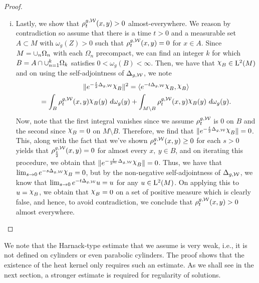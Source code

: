 \documentclass[a4paper, 12pt]{amsart}
\begin{document}
\begin{proof}
\begin{enumerate}[(i)]
\item Lastly, we show that $\rho^{g,\mathcal{W}}_t(x,y) > 0$  almost-everywhere.
	We reason by contradiction so assume that there
	is a time $t > 0$ and a measurable set $A \subset M$ with $\omega_g(Z) > 0$
	such that $\rho^{g,\mathcal{W}}_t(x,y) = 0$ for $x \in A$.
	Since $M = \cup_{n} \Omega_n$ with each 
	$\Omega_n$ precompact, we can find an integer
	$k$ for which $B = A \cap \cup_{n=1}^k \Omega_k$ 
	satisfies $0 < \omega_g(B) < \infty$. Then,
	we have that $\ind{B} \in \Lp{2}(M)$ and 
	on using the self-adjointness of $\Delta_{g,\mathcal{W}}$,
	we note
	\begin{multline*}  
	\norm{e^{-\frac{t}{2} \Delta_{g,\cW}}\ind{B}}^2 
		 = \inprod{e^{-t \Delta_{g,\cW}} \ind{B},\ind{B}} \\
		= \int_{B} \hk^{g,\cW}_t(x,y)\ind{B}(y)\ d\omega_g(y) + 
			\int_{M \setminus B} \hk^{g,\cW}_t(x,y)\ind{B}(y)\ d\omega_g(y).
	\end{multline*}
	Now, note that the first integral vanishes
	since we assume $\rho^{g,\mathcal{W}}_t$ is $0$ on $B$
	and the second since $\ind{B} = 0$ on $M \setminus B$.
	Therefore, we find that $\norm{e^{-\frac{t}{2} \Delta_{g,\cW}} \ind{B}} = 0$.
	This, along with the fact that we've shown $\rho^{g,\mathcal{W}}_s(x,y) \geq 0$ 
	for each $s > 0$ yields that $\rho^{g,\mathcal{W}}_{\frac{t}{2}}(x,y) = 0$ for 
	almost every $x,\ y \in B$, and on 
	iterating this procedure, we obtain that
	$\norm{e^{-\frac{t}{2^m} \Delta_{g,\cW}} \ind{B}} = 0$.
	Thus, we have that $\lim_{s\to 0} e^{-s \Delta_{g,\cW}} \ind{B} = 0$, 
	but by the non-negative self-adjointness of
	$\Delta_{g,\mathcal{W}}$, we know that $\lim_{s \to 0} e^{-t \Delta_{g,\mathcal{W}}} u = u$
	for any $u \in {\rm L}^{2}_{\rm {}}(M)$. On applying this to $u = \ind{B}$, we
	obtain that $\ind{B} = 0$ on a set of positive measure which is clearly false, 
	and hence, to avoid contradiction, we conclude that $\rho^{g,\mathcal{W}}_t(x,y) > 0$ almost everywhere.
\end{enumerate} 
\end{proof}

\begin{rem}
We note that the Harnack-type estimate that we assume is very 
weak, i.e., it is not defined on cylinders or even 
parabolic cylinders. The proof shows that the existence 
of the heat kernel only requires such an estimate. 
As we shall see in the next section, a stronger
estimate is required for regularity of solutions. 
\end{rem}
\end{document}
